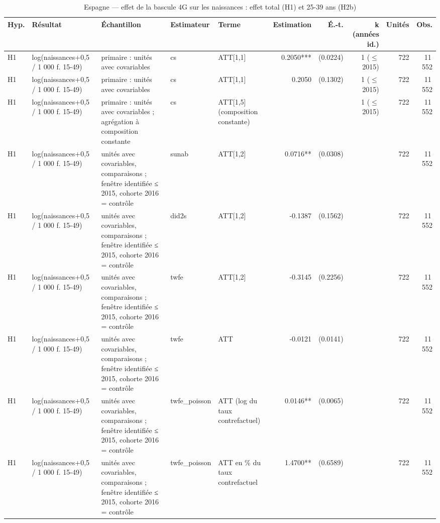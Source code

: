 \begin{table}\centering
\begin{threeparttable}
\caption{Espagne — effet de la bascule 4G sur les naissances : effet total (H1) et 25-39 ans (H2b)}\label{tab:es_main}
\scriptsize
\begin{tabular}{lp{4.0cm}p{6.1cm}lp{3.6cm}rrrrr}
\toprule
Hyp. & Résultat & Échantillon & Estimateur & Terme & Estimation & É.-t. & k (années id.) & Unités & Obs. \\
\midrule
H1 & log(naissances+0,5 / 1 000 f. 15-49) & primaire : unités avec covariables & cs & ATT[1,1] & 0.2050*** & (0.0224) & 1 ($\leq$ 2015) & 722 & 11\,552 \\
H1 & log(naissances+0,5 / 1 000 f. 15-49) & primaire : unités avec covariables & cs & ATT[1,1] & 0.2050 & (0.1302) & 1 ($\leq$ 2015) & 722 & 11\,552 \\
H1 & log(naissances+0,5 / 1 000 f. 15-49) & primaire : unités avec covariables ; agrégation à composition constante & cs & ATT[1,5] (composition constante) &  &  & 1 ($\leq$ 2015) & 722 & 11\,552 \\
H1 & log(naissances+0,5 / 1 000 f. 15-49) & unités avec covariables, comparaisons ; fenêtre identifiée ≤ 2015, cohorte 2016 = contrôle & sunab & ATT[1,2] & 0.0716** & (0.0308) &  & 722 & 11\,552 \\
H1 & log(naissances+0,5 / 1 000 f. 15-49) & unités avec covariables, comparaisons ; fenêtre identifiée ≤ 2015, cohorte 2016 = contrôle & did2s & ATT[1,2] & -0.1387 & (0.1562) &  & 722 & 11\,552 \\
H1 & log(naissances+0,5 / 1 000 f. 15-49) & unités avec covariables, comparaisons ; fenêtre identifiée ≤ 2015, cohorte 2016 = contrôle & twfe & ATT[1,2] & -0.3145 & (0.2256) &  & 722 & 11\,552 \\
H1 & log(naissances+0,5 / 1 000 f. 15-49) & unités avec covariables, comparaisons ; fenêtre identifiée ≤ 2015, cohorte 2016 = contrôle & twfe & ATT & -0.0121 & (0.0141) &  & 722 & 11\,552 \\
H1 & log(naissances+0,5 / 1 000 f. 15-49) & unités avec covariables, comparaisons ; fenêtre identifiée ≤ 2015, cohorte 2016 = contrôle & twfe\_poisson & ATT (log du taux contrefactuel) & 0.0146** & (0.0065) &  & 722 & 11\,552 \\
H1 & log(naissances+0,5 / 1 000 f. 15-49) & unités avec covariables, comparaisons ; fenêtre identifiée ≤ 2015, cohorte 2016 = contrôle & twfe\_poisson & ATT en \% du taux contrefactuel & 1.4700** & (0.6589) &  & 722 & 11\,552 \\

\end{tabular}
\end{threeparttable}
\end{table}
